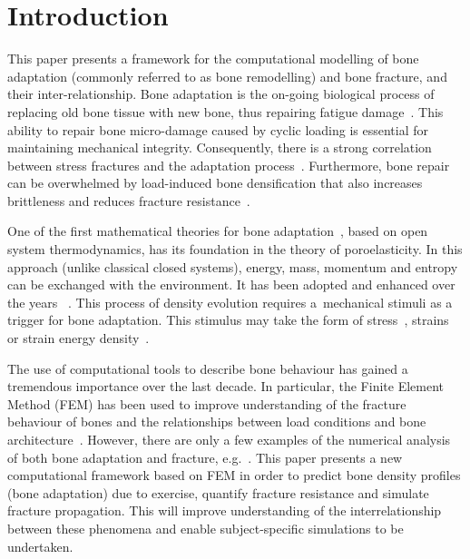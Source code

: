 \documentclass[review]{elsarticle}
\numberwithin{equation}{section}
\begin{document}
\linenumbers

\section{Introduction}
This paper presents a framework for the computational modelling of bone adaptation (commonly referred to as bone remodelling) and bone fracture, and their inter-relationship.
Bone adaptation is the on-going biological process of replacing old bone tissue with new bone, thus repairing fatigue damage~\citep{hughes2017role}.
This ability to repair bone micro-damage caused by cyclic loading is essential for maintaining mechanical integrity. Consequently, there is a strong correlation between stress fractures and the adaptation process~\citep{hughes2017role}. Furthermore, bone repair can be overwhelmed by load-induced bone densification that also increases brittleness and reduces fracture resistance~\citep{loughridge2017qualitative}.

One of the first mathematical theories for bone adaptation~\citep{cowin1976bone}, based on open system thermodynamics, has its foundation in the theory of poroelasticity. 
In this approach (unlike classical closed systems), energy, mass, momentum and entropy can be exchanged with the environment. It has been adopted and enhanced over the years
~\citep{harrigan1996bone, jacobs1995numerical, weinans1992behavior}.
This process of density evolution requires a~mechanical stimuli as a trigger for bone adaptation. This stimulus may take the form of stress~\citep{beaupre1990approach, carter1996mechanical, doblare2002anisotropic}, strains~\citep{cowin1976bone} or strain energy density~\citep{weinans1992behavior, kuhl2003theory,kaczmarczyk2011efficient, Connor2017bone}. 


The use of computational tools to describe bone behaviour has gained a tremendous importance over the last decade. 
In particular, the Finite Element Method (FEM) has been used to improve understanding of the fracture behaviour of bones and the relationships between load conditions and bone architecture~\citep{podshivalov2014road, poelert2013patient}. However, there are only a few examples of the numerical analysis of both bone adaptation and fracture, e.g.~\citep{hambli2013integrated}. This paper presents a new computational framework based on FEM in order to predict bone density profiles 
(bone adaptation) due to exercise, quantify fracture resistance and simulate fracture propagation. This will improve understanding of the interrelationship between these phenomena and enable subject-specific simulations to be undertaken.
\end{document}
